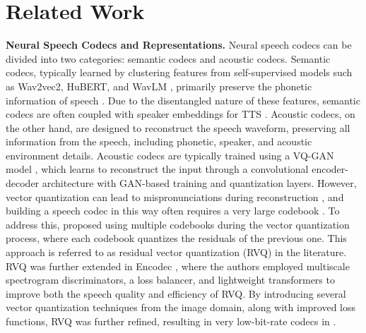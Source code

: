 \section{Related Work}
{\bf Neural Speech Codecs and Representations.}  Neural speech codecs can be divided into two categories: semantic codecs and acoustic codecs. Semantic codecs, typically learned by clustering features from self-supervised models such as Wav2vec2, HuBERT, and WavLM \citep{wav2vec2,hubert,wavlm}, primarily preserve the phonetic information of speech \citep{choi2024self}. Due to the disentangled nature of these features, semantic codecs are often coupled with speaker embeddings for TTS \citep{polyak2021speech,controlvc}.
Acoustic codecs, on the other hand, are designed to reconstruct the speech waveform, preserving all information from the speech, including phonetic, speaker, and acoustic environment details. Acoustic codecs are typically trained using a VQ-GAN model \citep{vqvae,esser2021taming}, which learns to reconstruct the input through a convolutional encoder-decoder architecture with GAN-based training and quantization layers.
However, vector quantization can lead to mispronunciations during reconstruction \citep{casanova2024xtts,betker2023better}, and building a speech codec in this way often requires a very large codebook \citep{zeghidour2021soundstream}.
To address this, \citep{zeghidour2021soundstream} proposed using multiple codebooks during the vector quantization process, where each codebook quantizes the residuals of the previous one. This approach is referred to as residual vector quantization (RVQ) in the literature. RVQ was further extended in Encodec \citep{defossez2022high}, where the authors employed multiscale spectrogram discriminators, a loss balancer, and lightweight transformers to improve both the speech quality and efficiency of RVQ. By introducing several vector quantization techniques from the image domain, along with improved loss functions, RVQ was further refined, resulting in very low-bit-rate codecs in \citep{kumar2024high}.

